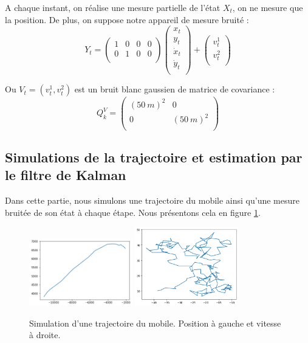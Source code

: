 \documentclass{article}
\begin{document}
A chaque instant, on réalise une mesure partielle de l'état $X_t$, on ne mesure 
que la position. De plus, on suppose notre appareil de mesure bruité : 
\[ Y_t = \left ( 
   \begin{array}{cccc} %
      1 & 0 & 0 & 0 \\
      0 & 1 & 0 & 0\\
   \end{array} \right )
   \left ( 
   \begin{array}{cccc} %
      x_{t} \\
      y_{t} \\
      \Dot{x}_{t} \\
      \Dot{y}_{t} \\
   \end{array} \right )+
  \left (
   \begin{array}{c}
      v_t^{1} \\
      v_t^2 \\
      
   \end{array} \right )
\]

Ou $V_t = \left(v_t^{1},v_t^2\right)$ est un bruit blanc gaussien de matrice de covariance : 
\[Q_{k}^{V}= \left (
   \begin{array}{cccc}
      (50\ m)^2 & 0 \\
      0 & (50\ m)^2 \\
   \end{array} \right )
\]

\subsection{Simulations de la trajectoire et estimation par le filtre de Kalman}
Dans cette partie, nous simulons une trajectoire du mobile ainsi qu'une mesure bruitée de son état à chaque étape. Nous présentons cela 
en figure \ref{TP2_pos_vit}. 
\begin{figure}[!htb]
\centering
\includegraphics[width=0.4\textwidth]{TP2/position_réelle.png}
\includegraphics[width=0.4\textwidth]{TP2/vitesse_reelle.png}
\caption{Simulation d'une trajectoire du mobile. Position à gauche et vitesse à droite.}
\label{TP2_pos_vit}
\end{figure}
\end{document}
